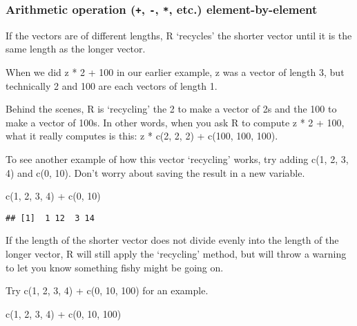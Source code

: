 \documentclass[
]{article}
\newenvironment{Shaded}{\begin{snugshade}}{\end{snugshade}}
\newcommand{\DecValTok}[1]{\textcolor[rgb]{0.00,0.00,0.81}{#1}}
\newcommand{\FunctionTok}[1]{\textcolor[rgb]{0.00,0.00,0.00}{#1}}
\newcommand{\NormalTok}[1]{#1}
\newcommand{\SpecialCharTok}[1]{\textcolor[rgb]{0.00,0.00,0.00}{#1}}
\begin{document}
\hypertarget{arithmetic-operation---etc.-element-by-element}{%
\subsubsection{\texorpdfstring{Arithmetic operation (\texttt{+},
\texttt{-}, \texttt{*}, etc.)
element-by-element}{Arithmetic operation (+, -, *, etc.) element-by-element}}\label{arithmetic-operation---etc.-element-by-element}}

If the vectors are of different lengths, R `recycles' the shorter vector
until it is the same length as the longer vector.

When we did z * 2 + 100 in our earlier example, z was a vector of length
3, but technically 2 and 100 are each vectors of length 1.

Behind the scenes, R is `recycling' the 2 to make a vector of 2s and the
100 to make a vector of 100s. In other words, when you ask R to compute
z * 2 + 100, what it really computes is this: z * c(2, 2, 2) + c(100,
100, 100).

To see another example of how this vector `recycling' works, try adding
c(1, 2, 3, 4) and c(0, 10). Don't worry about saving the result in a new
variable.

\begin{Shaded}
\begin{Highlighting}[]
\FunctionTok{c}\NormalTok{(}\DecValTok{1}\NormalTok{, }\DecValTok{2}\NormalTok{, }\DecValTok{3}\NormalTok{, }\DecValTok{4}\NormalTok{) }\SpecialCharTok{+} \FunctionTok{c}\NormalTok{(}\DecValTok{0}\NormalTok{, }\DecValTok{10}\NormalTok{)}
\end{Highlighting}
\end{Shaded}

\begin{verbatim}
## [1]  1 12  3 14
\end{verbatim}

If the length of the shorter vector does not divide evenly into the
length of the longer vector, R will still apply the `recycling' method,
but will throw a warning to let you know something fishy might be going
on.

Try c(1, 2, 3, 4) + c(0, 10, 100) for an example.

\begin{Shaded}
\begin{Highlighting}[]
\FunctionTok{c}\NormalTok{(}\DecValTok{1}\NormalTok{, }\DecValTok{2}\NormalTok{, }\DecValTok{3}\NormalTok{, }\DecValTok{4}\NormalTok{) }\SpecialCharTok{+} \FunctionTok{c}\NormalTok{(}\DecValTok{0}\NormalTok{, }\DecValTok{10}\NormalTok{, }\DecValTok{100}\NormalTok{)}
\end{Highlighting}
\end{Shaded}
\end{document}

